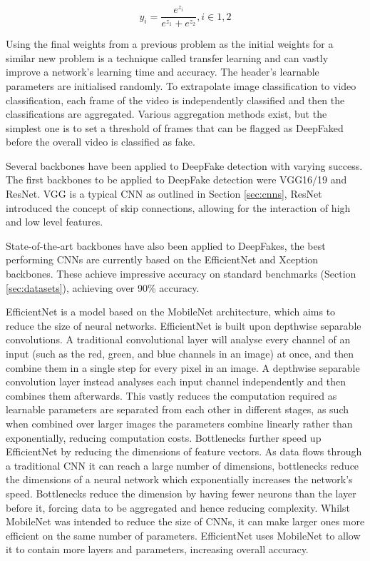 \begin{equation}
    \label{eq:softmax}
    y_i=\frac{e^{z_i}}{e^{z_1} + e^{z_2}}, i\in1,2
\end{equation}

Using the final weights from a previous problem as the initial weights for a similar new problem is a technique called transfer learning\cite{bozinovski1976influence} and can vastly improve a network's learning time and accuracy. The header's learnable parameters are initialised randomly. To extrapolate image classification to video classification, each frame of the video is independently classified and then the classifications are aggregated. Various aggregation methods exist, but the simplest one is to set a threshold of frames that can be flagged as DeepFaked before the overall video is classified as fake.

Several backbones have been applied to DeepFake detection with varying success\cite{thing2023deepfake}. The first backbones to be applied to DeepFake detection were VGG16/19\cite{simonyan2014very} and ResNet\cite{he2016deep}. VGG is a typical CNN as outlined in Section \ref{sec:cnns}, ResNet introduced the concept of skip connections, allowing for the interaction of high and low level features. 

State-of-the-art backbones have also been applied to DeepFakes, the best performing CNNs are currently based on the EfficientNet\cite{tan2019efficientnet} and Xception\cite{chollet2017xception} backbones. These achieve impressive accuracy on standard benchmarks (Section \ref{sec:datasets}), achieving over 90\% accuracy\cite{bonettini2021video}.

EfficientNet is a model based on the MobileNet\cite{howard2017mobilenets} architecture, which aims to reduce the size of neural networks. EfficientNet is built upon depthwise separable convolutions. A traditional convolutional layer will analyse every channel of an input (such as the red, green, and blue channels in an image) at once, and then combine them in a single step for every pixel in an image. A depthwise separable convolution layer instead analyses each input channel independently and then combines them afterwards. This vastly reduces the computation required as learnable parameters are separated from each other in different stages, as such when combined over larger images the parameters combine linearly rather than exponentially, reducing computation costs. Bottlenecks further speed up EfficientNet by reducing the dimensions of feature vectors. As data flows through a traditional CNN it can reach a large number of dimensions, bottlenecks reduce the dimensions of a neural network which exponentially increases the network's speed. Bottlenecks reduce the dimension by having fewer neurons than the layer before it, forcing data to be aggregated and hence reducing complexity. Whilst MobileNet was intended to reduce the size of CNNs, it can make larger ones more efficient on the same number of parameters. EfficientNet uses MobileNet to allow it to contain more layers and parameters, increasing overall accuracy.

